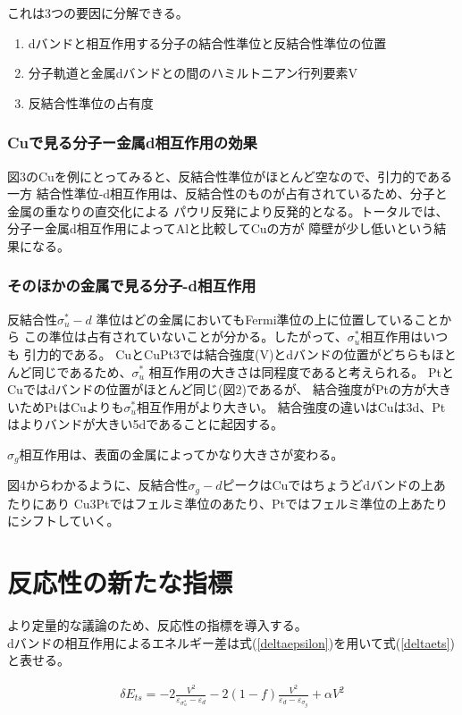 \documentclass[12pt]{ltjsarticle}
\begin{document}
これは3つの要因に分解できる。
\begin{enumerate}
  \item dバンドと相互作用する分子の結合性準位と反結合性準位の位置
  \item 分子軌道と金属dバンドとの間のハミルトニアン行列要素V
  \item 反結合性準位の占有度
\end{enumerate}

\subsubsection{Cuで見る分子ー金属d相互作用の効果}
図3のCuを例にとってみると、反結合性準位がほとんど空なので、引力的である一方
結合性準位-d相互作用は、反結合性のものが占有されているため、分子と金属の重なりの直交化による
パウリ反発により反発的となる。トータルでは、分子ー金属d相互作用によってAlと比較してCuの方が
障壁が少し低いという結果になる。

\subsubsection{そのほかの金属で見る分子-d相互作用}
反結合性$ \sigma _u ^* -d$ 準位はどの金属においてもFermi準位の上に位置していることから
この準位は占有されていないことが分かる。したがって、$ \sigma _u ^*$相互作用はいつも
引力的である。
CuとCuPt3では結合強度(V)とdバンドの位置がどちらもほとんど同じであるため、$ \sigma _u ^*$
相互作用の大きさは同程度であると考えられる。
PtとCuではdバンドの位置がほとんど同じ(図2)であるが、
結合強度がPtの方が大きいためPtはCuよりも$ \sigma _u ^*$相互作用がより大きい。
結合強度の違いはCuは3d、Ptはよりバンドが大きい5dであることに起因する。

$\sigma _g$相互作用は、表面の金属によってかなり大きさが変わる。

図4からわかるように、反結合性$\sigma _g -d$ピークはCuではちょうどdバンドの上あたりにあり
Cu3Ptではフェルミ準位のあたり、Ptではフェルミ準位の上あたりにシフトしていく。

\section{反応性の新たな指標}
より定量的な議論のため、反応性の指標を導入する。\\
dバンドの相互作用によるエネルギー差は式(\ref{deltaepsilon})を用いて式(\ref{deltaets})と表せる。

\begin{eqnarray}
    \label{deltaets}
    \delta E_{ts} = -2 \frac{ V^2 }{\varepsilon _{\sigma_u^*} - \varepsilon _d}
                    -2(1-f)\frac{V^2}{\varepsilon _d - \varepsilon _{\sigma_g}}
                    + \alpha V^2
\end{eqnarray}
\end{document}
